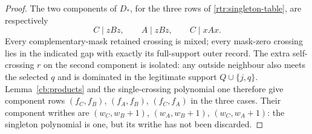 \begin{proof}
The two components of $D_*$, for the three rows of
\eqref{rtr:singleton-table}, are respectively
\begin{equation}\label{rtr:singleton-components}
 C\mid zBz,\qquad A\mid zBz,\qquad C\mid xAx.
\end{equation}
Every complementary-mask retained crossing is mixed; every mask-zero
crossing lies in the indicated gap with exactly its full-support
outer record. The extra self-crossing $r$ on the second component is
isolated: any outside neighbour also meets the selected $q$ and is
dominated in the legitimate support $Q\cup\{j,q\}$.
Lemma~\ref{cb:products} and the single-crossing polynomial one
therefore give component rows $(f_C,f_B)$, $(f_A,f_B)$,
$(f_C,f_A)$ in the three cases. Their component writhes are
$(w_C,w_B+1)$, $(w_A,w_B+1)$, $(w_C,w_A+1)$: the singleton
polynomial is one, but its writhe has not been discarded.


\end{proof}
